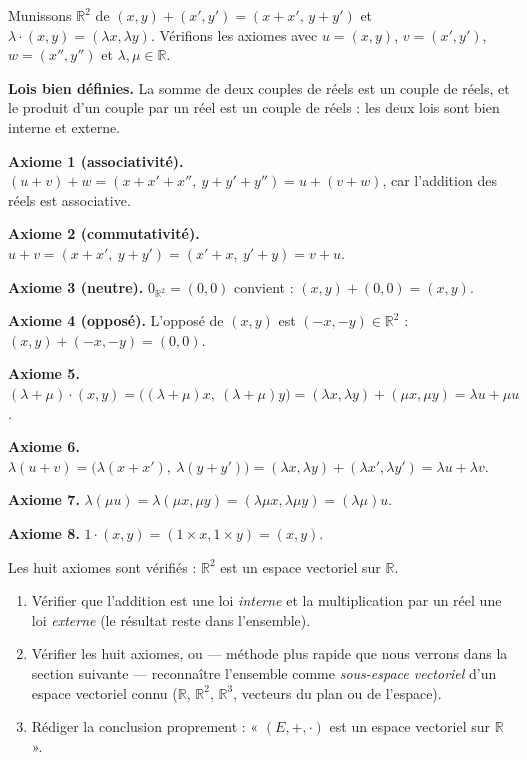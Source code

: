 \documentclass[11pt]{article}
\begin{document}
\begin{exemplebox}
Munissons $\mathbb{R}^2$ de $(x,y) + (x',y') = (x+x',\, y+y')$ et $\lambda \cdot (x,y) = (\lambda x, \lambda y)$. Vérifions les axiomes avec $u = (x,y)$, $v = (x',y')$, $w = (x'',y'')$ et $\lambda, \mu \in \mathbb{R}$.

\textbf{Lois bien définies.} La somme de deux couples de réels est un couple de réels, et le produit d'un couple par un réel est un couple de réels : les deux lois sont bien interne et externe.

\textbf{Axiome 1 (associativité).} $(u+v)+w = (x+x'+x'',\ y+y'+y'') = u+(v+w)$, car l'addition des réels est associative.

\textbf{Axiome 2 (commutativité).} $u+v = (x+x',\ y+y') = (x'+x,\ y'+y) = v+u$.

\textbf{Axiome 3 (neutre).} $0_{\mathbb{R}^2} = (0,0)$ convient : $(x,y) + (0,0) = (x,y)$.

\textbf{Axiome 4 (opposé).} L'opposé de $(x,y)$ est $(-x,-y) \in \mathbb{R}^2$ : $(x,y) + (-x,-y) = (0,0)$.

\textbf{Axiome 5.} $(\lambda+\mu)\cdot(x,y) = \big((\lambda+\mu)x,\ (\lambda+\mu)y\big) = (\lambda x, \lambda y) + (\mu x, \mu y) = \lambda u + \mu u$.

\textbf{Axiome 6.} $\lambda(u+v) = \big(\lambda(x+x'),\ \lambda(y+y')\big) = (\lambda x, \lambda y) + (\lambda x', \lambda y') = \lambda u + \lambda v$.

\textbf{Axiome 7.} $\lambda(\mu u) = \lambda(\mu x, \mu y) = (\lambda\mu x, \lambda\mu y) = (\lambda\mu)u$.

\textbf{Axiome 8.} $1 \cdot (x,y) = (1 \times x, 1 \times y) = (x,y)$.

Les huit axiomes sont vérifiés : $\mathbb{R}^2$ est un espace vectoriel sur $\mathbb{R}$.
\end{exemplebox}

\begin{methode}
\begin{enumerate}
\item Vérifier que l'addition est une loi \emph{interne} et la multiplication par un réel une loi \emph{externe} (le résultat reste dans l'ensemble).
\item Vérifier les huit axiomes, ou — méthode plus rapide que nous verrons dans la section suivante — reconnaître l'ensemble comme \emph{sous-espace vectoriel} d'un espace vectoriel connu ($\mathbb{R}$, $\mathbb{R}^2$, $\mathbb{R}^3$, vecteurs du plan ou de l'espace).
\item Rédiger la conclusion proprement : « $(E,+,\cdot)$ est un espace vectoriel sur $\mathbb{R}$ ».
\end{enumerate}
\end{methode}
\end{document}
